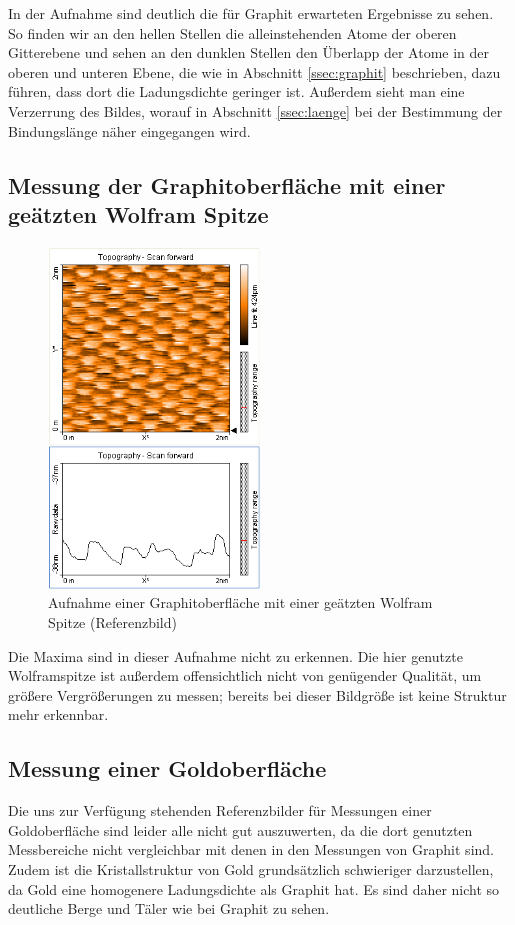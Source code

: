 \documentclass[10pt, a4paper]{article}
\begin{document}
In der Aufnahme sind deutlich die für Graphit erwarteten Ergebnisse zu sehen.
So finden wir an den hellen Stellen die alleinstehenden Atome der oberen Gitterebene und sehen an den dunklen Stellen den Überlapp der Atome in der oberen und unteren Ebene, die wie in Abschnitt \ref{ssec:graphit} beschrieben, dazu führen, dass dort die Ladungsdichte geringer ist.
Außerdem sieht man eine Verzerrung des Bildes, worauf in Abschnitt \ref{ssec:laenge} bei der Bestimmung der Bindungslänge näher eingegangen wird.

\subsection{Messung der Graphitoberfläche mit einer geätzten Wolfram Spitze}
\begin{figure}[!h]
\centering
\includegraphics[width=0.5\textwidth]{./grafiken/originale/ref_graphit_w_2nm.png}
\caption{Aufnahme einer Graphitoberfläche mit einer geätzten Wolfram Spitze (Referenzbild)}
\label{fig:ref_w}
\end{figure}

Die Maxima sind in dieser Aufnahme nicht zu erkennen.
Die hier genutzte Wolframspitze ist außerdem offensichtlich nicht von genügender Qualität, um größere Vergrößerungen zu messen; bereits bei dieser Bildgröße ist keine Struktur mehr erkennbar.

\subsection{Messung einer Goldoberfläche}
Die uns zur Verfügung stehenden Referenzbilder für Messungen einer Goldoberfläche sind leider alle nicht gut auszuwerten, da die dort genutzten Messbereiche nicht vergleichbar mit denen in den Messungen von Graphit sind.
Zudem ist die Kristallstruktur von Gold grundsätzlich schwieriger darzustellen, da Gold eine homogenere Ladungsdichte als Graphit hat.
Es sind daher nicht so deutliche Berge und Täler wie bei Graphit zu sehen. 
\end{document}
